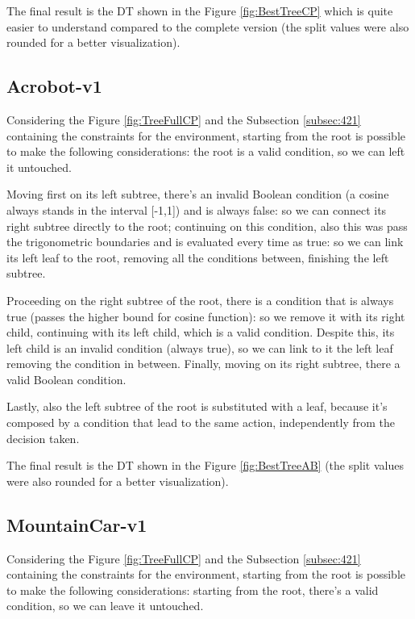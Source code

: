 The final result is the DT shown in the Figure \ref{fig:BestTreeCP} which is quite easier to understand compared to the complete version (the split values were also rounded for a better visualization).



\subsection{Acrobot-v1}
Considering the Figure \ref{fig:TreeFullCP} and the Subsection \ref{subsec:421} containing the constraints for the environment, starting from the root is possible to make the following considerations: the root is a valid condition, so we can left it untouched.

Moving first on its left subtree, there's an invalid Boolean condition (a cosine always stands in the interval [-1,1]) and is always false: so we can connect its right subtree directly to the root; continuing on this condition, also this was pass the trigonometric boundaries and is evaluated every time as true: so we can link its left leaf to the root, removing all the conditions between, finishing the left subtree.

Proceeding on the right subtree of the root, there is a condition that is always true (passes the higher bound for cosine function): so we remove it with its right child, continuing with its left child, which is a valid condition. Despite this, its left child is an invalid condition (always true), so we can link to it the left leaf removing the condition in between. Finally, moving on its right subtree, there a valid Boolean condition.

Lastly, also the left subtree of the root is substituted with a leaf, because it's composed by a condition that lead to the same action, independently from the decision taken.

The final result is the DT shown in the Figure \ref{fig:BestTreeAB} (the split values were also rounded for a better visualization).


\subsection{MountainCar-v1}
Considering the Figure \ref{fig:TreeFullCP} and the Subsection \ref{subsec:421} containing the constraints for the environment, starting from the root is possible to make the following considerations: starting from the root, there's a valid condition, so we can leave it untouched.


